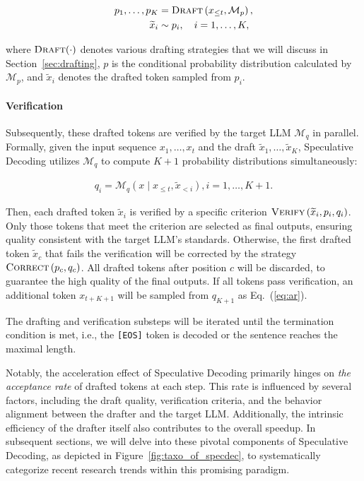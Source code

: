 \begin{equation}
\begin{aligned}
p_1, \dots, p_K &= \textsc{Draft}\left(x_{\leq t}, \mathcal{M}_p\right), \\
\widetilde{x}_i &\sim p_i, \quad i=1, \dots, K,
\end{aligned}
\label{eq:draft-computing}
\end{equation}

where $\textsc{Draft}(\cdot)$ denotes various drafting strategies that we will discuss in Section~\ref{sec:drafting}, $p$ is the conditional probability distribution calculated by $\mathcal{M}_{p}$, and $\widetilde{x}_i$ denotes the drafted token sampled from $p_i$.

\paragraph{Verification} Subsequently, these drafted tokens are verified by the target LLM $\mathcal{M}_{q}$ in parallel. Formally, given the input sequence $x_1, \dots, x_t$ and the draft $\widetilde{x}_1, \dots, \widetilde{x}_K$, Speculative Decoding utilizes $\mathcal{M}_{q}$ to compute $K+1$ probability distributions simultaneously:

\begin{align}\label{eq:verify_computing}
q_{i} = \mathcal{M}_q\left(x\mid x_{\leq t}, \widetilde{x}_{<i}\right), i=1, \dots, K+1.
\end{align}

Then, each drafted token $\widetilde{x}_i$ is verified by a specific criterion $\textsc{Verify}\left(\widetilde{x}_i, p_{i}, q_{i}\right)$. Only those tokens that meet the criterion are selected as final outputs, ensuring quality consistent with the target LLM's standards. Otherwise, the first drafted token $\widetilde{x}_c$ that fails the verification will be corrected by the strategy $\textsc{Correct}\left(p_{c}, q_{c}\right)$. All drafted tokens after position $c$ will be discarded, to guarantee the high quality of the final outputs. If all tokens pass verification, an additional token $x_{t+K+1}$ will be sampled from $q_{K+1}$ as Eq.~(\ref{eq:ar}). 

The drafting and verification substeps will be iterated until the termination condition is met, i.e., the \texttt{[EOS]} token is decoded or the sentence reaches the maximal length. 

Notably, the acceleration effect of Speculative Decoding primarily hinges on \textit{the acceptance rate} of drafted tokens at each step. This rate is influenced by several factors, including the draft quality, verification criteria, and the behavior alignment between the drafter and the target LLM. Additionally, the intrinsic efficiency of the drafter itself also contributes to the overall speedup. In subsequent sections, we will delve into these pivotal components of Speculative Decoding, as depicted in Figure~\ref{fig:taxo_of_specdec}, to systematically categorize recent research trends within this promising paradigm.

